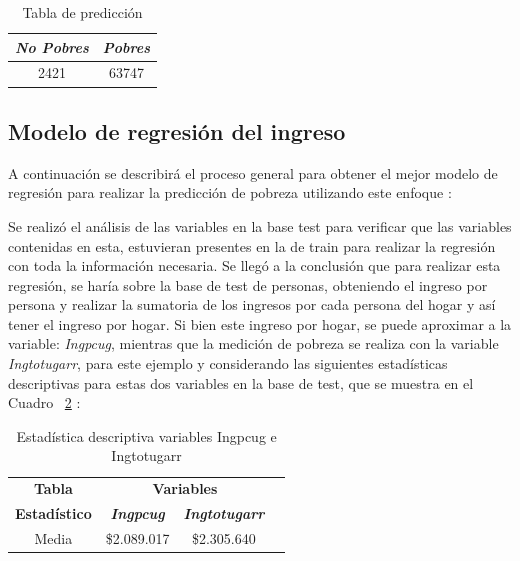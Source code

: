 \documentclass[conference, 10pt]{IEEEtran}
\begin{document}
\begin{table}[htbp]
\caption{Tabla de predicción}
\begin{center}
\begin{tabular}{|c|c|}
\hline
\textbf{\textit{No Pobres}}& \textbf{\textit{Pobres}}\\
\hline
2421&63747\\
\hline

\end{tabular}
\label{tab_11}
\end{center}
\end{table}


\subsection{Modelo de regresión del ingreso} \label{AA}
A continuación se describirá el proceso general para obtener el mejor modelo de regresión para realizar la predicción de pobreza utilizando este enfoque :



Se realizó el análisis de las variables en la base test para verificar que las variables contenidas en esta, estuvieran presentes en la de train para realizar la regresión con toda la información necesaria. Se llegó a la conclusión que para realizar esta regresión, se haría sobre la base de test de personas, obteniendo el ingreso por persona y realizar la sumatoria de los ingresos por cada persona del hogar y así tener el ingreso por hogar. Si bien este ingreso por hogar, se puede aproximar a la variable: \textit{Ingpcug}, mientras que la medición de pobreza se realiza con la variable \textit{Ingtotugarr}, para este ejemplo y considerando las siguientes estadísticas descriptivas para estas dos variables en la base de test, que se muestra en el Cuadro ~\ref{tab_1} :

\begin{table}[htbp]
\caption{Estadística descriptiva variables Ingpcug e Ingtotugarr}
\begin{center}
\begin{tabular}{|c|c|c|c|}
\hline
\textbf{Tabla}&\multicolumn{2}{|c|}{\textbf{Variables}} \\
\cline{2-3} 
\textbf{Estadístico} & \textbf{\textit{Ingpcug}}& \textbf{\textit{Ingtotugarr}} \\
\hline
Media& \$2.089.017&\$2.305.640\\
\hline
\end{tabular}
\label{tab_1}
\end{center}
\end{table}
\end{document}
